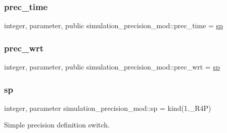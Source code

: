 \subsubsection{\texorpdfstring{prec\+\_\+time}{prec\_time}}
{\footnotesize\ttfamily integer, parameter, public simulation\+\_\+precision\+\_\+mod\+::prec\+\_\+time = \hyperlink{namespacesimulation__precision__mod_a15b1ab993f9b11430e9d9d3dc6c77614}{sp}}

\mbox{\label{namespacesimulation__precision__mod_ad515822198607dfee68a6ed8b246c7da}} 
\subsubsection{\texorpdfstring{prec\+\_\+wrt}{prec\_wrt}}
{\footnotesize\ttfamily integer, parameter, public simulation\+\_\+precision\+\_\+mod\+::prec\+\_\+wrt = \hyperlink{namespacesimulation__precision__mod_a15b1ab993f9b11430e9d9d3dc6c77614}{sp}}

\mbox{\label{namespacesimulation__precision__mod_a15b1ab993f9b11430e9d9d3dc6c77614}} 
\subsubsection{\texorpdfstring{sp}{sp}}
{\footnotesize\ttfamily integer, parameter simulation\+\_\+precision\+\_\+mod\+::sp = kind(1.\+\_\+\+R4P)\hspace{0.3cm}{\ttfamily [private]}}



Simple precision definition switch. 

